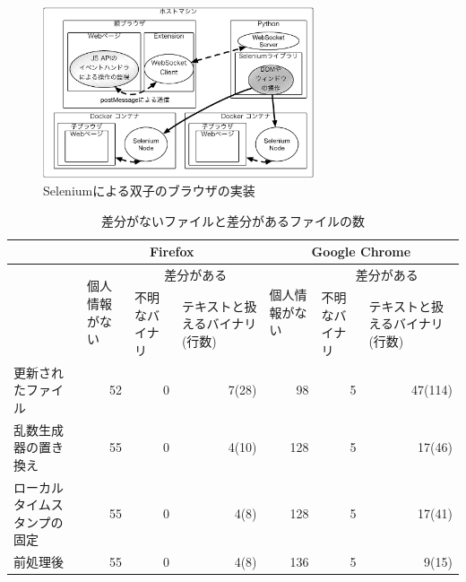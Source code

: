 \documentclass[submit,techrep]{ipsj}
\begin{document}
\begin{itemize}
\begin{figure}[t]
\begin{center}
\includegraphics[width=8cm]{img/cobrow-3.eps}
 \caption{Seleniumによる双子のブラウザの実装}
  \label{cobrow}
  \end{center}
\end{figure}


\begin{table}[ht]
\caption{差分がないファイルと差分があるファイルの数}
\centering
\begin{tabular}{|p{2cm}|l|p{1.9cm}|p{1.9cm}|l|p{1.9cm}|p{1.9cm}|}
\hline
&\multicolumn{3}{|c|}{\footnotesize{Firefox}}&\multicolumn{3}{c|}{\footnotesize{Google Chrome}}\\
\hline
&\multirow{2}{1.5cm}{\footnotesize{個人情報がない}} &
\multicolumn{2}{c|}{\footnotesize{差分がある}} &\multirow{2}{1.5cm}{\footnotesize{個人情報がない}}&
\multicolumn{2}{c|}{\footnotesize{差分がある}} \\
\cline{3-4}\cline{6-7}
  & & \footnotesize{不明なバイナリ} & \footnotesize{テキストと扱えるバイナリ(行数)}& &\footnotesize{不明なバイナリ} & \footnotesize{テキストと扱えるバイナリ(行数)} \\
\hline
\footnotesize{更新されたファイル}&\multicolumn{1}{r|}{\footnotesize{52}}&\multicolumn{1}{r|}{\footnotesize{0}}&\multicolumn{1}{r|}{\footnotesize{7(28)}}  & \multicolumn{1}{r|}{\footnotesize{98}} & \multicolumn{1}{r|}{\footnotesize{5}} & \multicolumn{1}{r|}{\footnotesize{47(114)}} \\
\hline
\footnotesize{乱数生成器の置き換え}&\multicolumn{1}{r|}{\footnotesize{55}}&\multicolumn{1}{r|}{\footnotesize{0}}&\multicolumn{1}{r|}{\footnotesize{4(10)} }& \multicolumn{1}{r|}{\footnotesize{128} }& \multicolumn{1}{r|}{\footnotesize{5} }& \multicolumn{1}{r|}{\footnotesize{17(46)}} \\
\hline
\footnotesize{ローカルタイムスタンプの固定}&\multicolumn{1}{r|}{\footnotesize{55}}&\multicolumn{1}{r|}{\footnotesize{0}}&\multicolumn{1}{r|}{\footnotesize{4(8)} }&  \multicolumn{1}{r|}{\footnotesize{128} }& \multicolumn{1}{r|}{\footnotesize{5} }&\multicolumn{1}{r|}{\footnotesize{17(41) }}\\
\hline
\footnotesize{前処理後}&\multicolumn{1}{r|}{\footnotesize{55}}&\multicolumn{1}{r|}{\footnotesize{0}}&\multicolumn{1}{r|}{\footnotesize{4(8)}} &\multicolumn{1}{r|}{ \footnotesize{136} }& \multicolumn{1}{r|}{\footnotesize{5} }&\multicolumn{1}{r|}{\footnotesize{9(15)}}\\
\hline
\end{tabular}
\label{fig:result}
\end{table}


\end{itemize}
\end{document}
